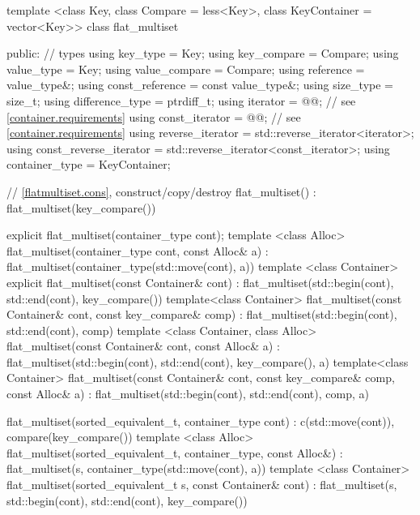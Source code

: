 \begin{codeblock}
\begin{codeblock}
\begin{codeblock}
\begin{addedblock}
\begin{codeblock}
template <class Key, class Compare = less<Key>, class KeyContainer = vector<Key>>
class flat_multiset {
  public:
    // types
    using key_type                  = Key;
    using key_compare               = Compare;
    using value_type                = Key;
    using value_compare             = Compare;
    using reference                 = value_type&;
    using const_reference           = const value_type&;
    using size_type                 = size_t;
    using difference_type           = ptrdiff_t;
    using iterator                  = @@; // see \ref{container.requirements}
    using const_iterator            = @@; // see \ref{container.requirements}
    using reverse_iterator          = std::reverse_iterator<iterator>;
    using const_reverse_iterator    = std::reverse_iterator<const_iterator>;
    using container_type            = KeyContainer;

    // \ref{flatmultiset.cons}, construct/copy/destroy
    flat_multiset() : flat_multiset(key_compare()) { }

    explicit flat_multiset(container_type cont);
    template <class Alloc>
      flat_multiset(container_type cont, const Alloc& a)
        : flat_multiset(container_type(std::move(cont), a)) { }
    template <class Container>
      explicit flat_multiset(const Container& cont)
        : flat_multiset(std::begin(cont), std::end(cont), key_compare()) { }
    template<class Container>
    flat_multiset(const Container& cont, const key_compare& comp)
        : flat_multiset(std::begin(cont), std::end(cont), comp) { }
    template <class Container, class Alloc>
      flat_multiset(const Container& cont, const Alloc& a)
        : flat_multiset(std::begin(cont), std::end(cont), key_compare(), a) { }
    template<class Container>
    flat_multiset(const Container& cont, const key_compare& comp, const Alloc& a)
        : flat_multiset(std::begin(cont), std::end(cont), comp, a) { }

    flat_multiset(sorted_equivalent_t, container_type cont)
      : c(std::move(cont)), compare(key_compare()) { }
    template <class Alloc>
      flat_multiset(sorted_equivalent_t, container_type, const Alloc&)
        : flat_multiset(s, container_type(std::move(cont), a)) { }
    template <class Container>
      flat_multiset(sorted_equivalent_t s, const Container& cont)
        : flat_multiset(s, std::begin(cont), std::end(cont), key_compare()) { }

}
\end{codeblock}
\end{addedblock}
\end{codeblock}
\end{codeblock}
\end{codeblock}
